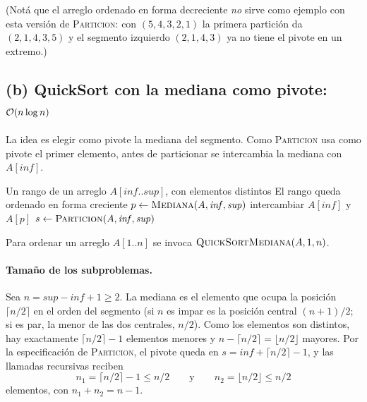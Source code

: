 (Notá que el arreglo ordenado en forma decreciente \emph{no} sirve como ejemplo con esta
versión de \textsc{Particion}: con $(5,4,3,2,1)$ la primera partición da $(2,1,4,3,5)$ y el
segmento izquierdo $(2,1,4,3)$ ya no tiene el pivote en un extremo.)

\subsection*{(b) QuickSort con la mediana como pivote: $\mathcal{O}(n\log n)$}

La idea es elegir como pivote la mediana del segmento. Como \textsc{Particion} usa como
pivote el primer elemento, antes de particionar se intercambia la mediana con
$A[\mathit{inf}]$.

\begin{algorithm}[H]
\caption{QuickSort con mediana}
\begin{algorithmic}[1]
\Require Un rango de un arreglo $A[\mathit{inf}..\mathit{sup}]$, con elementos distintos
\Ensure El rango queda ordenado en forma creciente
   
    \State $p\gets\Call{Mediana}{A,\mathit{inf},\mathit{sup}}$
    \State intercambiar $A[\mathit{inf}]$ y $A[p]$ 
    \State $s\gets\Call{Particion}{A,\mathit{inf},\mathit{sup}}$ 
    \State {} 
    \State {}
  \EndIf {}
\EndProcedure
\end{algorithmic}
\end{algorithm}
Para ordenar un arreglo $A[1..n]$ se invoca $\textsc{QuickSortMediana}(A,1,n)$.

\paragraph{Tamaño de los subproblemas.} Sea $n=\mathit{sup}-\mathit{inf}+1\ge2$. La mediana
es el elemento que ocupa la posición $\lceil n/2\rceil$ en el orden del segmento (si $n$ es
impar es la posición central $(n+1)/2$; si es par, la menor de las dos centrales, $n/2$).
Como los elementos son distintos, hay exactamente $\lceil n/2\rceil-1$ elementos menores y
$n-\lceil n/2\rceil=\lfloor n/2\rfloor$ mayores. Por la especificación de
\textsc{Particion}, el pivote queda en $s=\mathit{inf}+\lceil n/2\rceil-1$, y las
llamadas recursivas reciben
\[
n_1=\lceil n/2\rceil-1\le n/2\qquad\text{y}\qquad n_2=\lfloor n/2\rfloor\le n/2
\]
elementos, con $n_1+n_2=n-1$.

